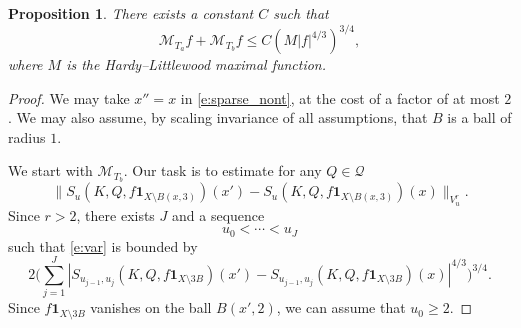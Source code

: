 \documentclass[12pt,reqno,a4paper,dvipsnames]{amsart}
\theoremstyle{plain}
\newtheorem{prop}[theorem]{Proposition}
\theoremstyle{definition}
\numberwithin{theorem}{section}
\numberwithin{equation}{section}
\begin{document}
\begin{prop}\label{p:sparse}
    There exists a constant $C$ such that
    \[
        \mathcal{M}_{T_a}f + \mathcal{M}_{T_b}f \le C (M|f|^{4/3})^{3/4},
    \]
    where $M$ is the Hardy--Littlewood maximal function.
\end{prop}


\begin{proof}
    We may take $x'' = x$ in \eqref{e:sparse_nont}, at the cost of a factor of at most $2$. We may also assume, by scaling invariance of all assumptions, that $B$ is a ball of radius $1$. 
        
   We start with $\mathcal{M}_{T_b}$. Our task is to estimate for any $Q \in \mathcal{Q}$
    \begin{equation}\label{e:var}
        \|S_u(K, Q, f \mathbf{1}_{X \setminus B(x,3)})(x') - S_u(K, Q, f\mathbf{1}_{X \setminus B(x,3)})(x)\|_{V^r_u}.
    \end{equation}
    Since $r > 2$, there exists $J$ and a sequence
    \begin{equation}\label{e:partition}
        u_0 < \dotsb < u_J
    \end{equation}
    such that \eqref{e:var} is bounded by
    \begin{equation}\label{e:var2}
         2 \Big(\sum_{j = 1}^J |S_{u_{j-1}, u_j}(K, Q, f \mathbf{1}_{X \setminus 3B})(x') - S_{u_{j-1}, u_j} (K, Q, f \mathbf{1}_{X \setminus 3B})(x)|^{4/3}\Big)^{3/4}.
    \end{equation}
    Since $f\mathbf{1}_{X \setminus 3B}$ vanishes on the ball $B(x', 2)$, we can assume that $u_0 \ge 2$. 
    

\end{proof}
\end{document}
